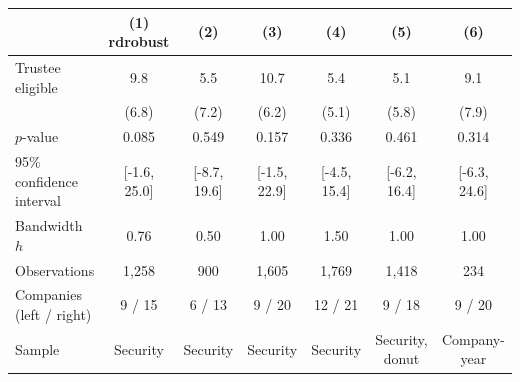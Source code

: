 \begin{tabular}{lcccccc}
\toprule
 & (1) rdrobust & (2) & (3) & (4) & (5) & (6) \\
\midrule
Trustee eligible & 9.8 & 5.5 & 10.7 & 5.4 & 5.1 & 9.1 \\
 & (6.8) & (7.2) & (6.2) & (5.1) & (5.8) & (7.9) \\
$p$-value & 0.085 & 0.549 & 0.157 & 0.336 & 0.461 & 0.314 \\
95\% confidence interval & [-1.6, 25.0] & [-8.7, 19.6] & [-1.5, 22.9] & [-4.5, 15.4] & [-6.2, 16.4] & [-6.3, 24.6] \\
Bandwidth $h$ & 0.76 & 0.50 & 1.00 & 1.50 & 1.00 & 1.00 \\
Observations & 1,258 & 900 & 1,605 & 1,769 & 1,418 & 234 \\
Companies (left / right) & 9 / 15 & 6 / 13 & 9 / 20 & 12 / 21 & 9 / 18 & 9 / 20 \\
Sample & Security & Security & Security & Security & Security, donut & Company-year \\
\bottomrule
\end{tabular}
